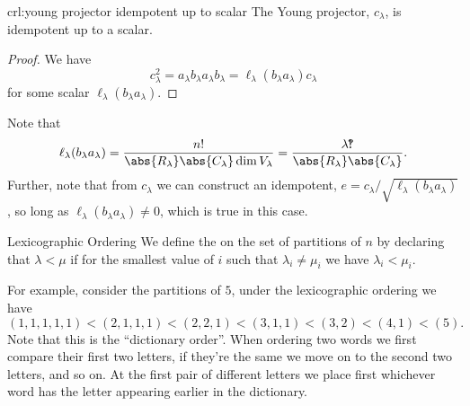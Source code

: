 \begin{crl}{}{crl:young projector idempotent up to scalar}
    The Young projector, \(c_\lambda\), is idempotent up to a scalar.
    \begin{proof}
        We have
        \begin{equation}
            c_\lambda^2 = a_\lambda b_\lambda a_\lambda b_\lambda = \ell_\lambda(b_\lambda a_\lambda) c_\lambda
        \end{equation}
        for some scalar \(\ell_\lambda(b_\lambda a_\lambda)\).
    \end{proof}
\end{crl}

Note that
\begin{equation}
    \ell_\lambda(b_\lambda a_\lambda) = \frac{n!}{\abs{\rowGroup_\lambda} \abs{\columnGroup_\lambda} \dim V_\lambda} = \frac{\lambda \intterobang}{\abs{\rowGroup_\lambda} \abs{\columnGroup_\lambda}}.
\end{equation}
Further, note that from \(c_\lambda\) we can construct an idempotent, \(e = c_\lambda/\sqrt{\ell_\lambda(b_\lambda a_\lambda)}\), so long as \(\ell_\lambda(b_\lambda a_\lambda) \ne 0\), which is true in this case.

\begin{dfn}{Lexicographic Ordering}{}
    We define the  on the set of partitions of \(n\) by declaring that \(\lambda < \mu\) if for the smallest value of \(i\) such that \(\lambda_i \ne \mu_i\) we have \(\lambda_i < \mu_i\).
\end{dfn}

For example, consider the partitions of \(5\), under the lexicographic ordering we have
\begin{equation}
    (1,1,1,1,1) < (2,1,1,1) < (2,2,1) < (3,1,1) < (3,2) < (4,1) < (5).
\end{equation}
Note that this is the \enquote{dictionary order}.
When ordering two words we first compare their first two letters, if they're the same we move on to the second two letters, and so on.
At the first pair of different letters we place first whichever word has the letter appearing earlier in the dictionary.

